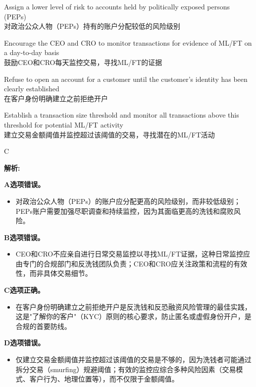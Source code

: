 \documentclass{article}
\newenvironment{explanation}
{\textbf{解析:}\par}
{\par}
\begin{document}
\begin{choices}
    \item Assign a lower level of risk to accounts held by politically exposed persons (PEPs)\\对政治公众人物（PEPs）持有的账户分配较低的风险级别
    \item Encourage the CEO and CRO to monitor transactions for evidence of ML/FT on a day-to-day basis\\鼓励CEO和CRO每天监控交易，寻找ML/FT的证据
    \item Refuse to open an account for a customer until the customer's identity has been clearly established\\在客户身份明确建立之前拒绝开户
    \item Establish a transaction size threshold and monitor all transactions above this threshold for potential ML/FT activity\\建立交易金额阈值并监控超过该阈值的交易，寻找潜在的ML/FT活动
\end{choices}

\begin{correctanswer}
    C
\end{correctanswer}
\begin{explanation}
    \textbf{A选项错误。}
    \begin{itemize}
        \item 对政治公众人物（PEPs）的账户应分配更高的风险级别，而非较低级别；PEPs账户需要加强尽职调查和持续监控，因为其面临更高的洗钱和腐败风险。
    \end{itemize}

    \textbf{B选项错误。}
    \begin{itemize}
        \item CEO和CRO不应亲自进行日常交易监控以寻找ML/FT证据，这种日常监控应由专门的合规部门和反洗钱团队负责；CEO和CRO应关注政策和流程的有效性，而非具体交易细节。
    \end{itemize}

    \textbf{C选项正确。}
    \begin{itemize}
        \item 在客户身份明确建立之前拒绝开户是反洗钱和反恐融资风险管理的最佳实践，这是"了解你的客户"（KYC）原则的核心要求，防止匿名或虚假身份开户，是合规的首要防线。
    \end{itemize}

    \textbf{D选项错误。}
    \begin{itemize}
        \item 仅建立交易金额阈值并监控超过该阈值的交易是不够的，因为洗钱者可能通过拆分交易（smurfing）规避阈值；有效的监控应综合多种风险因素（交易模式、客户行为、地理位置等），而不仅限于金额阈值。
    \end{itemize}
\end{explanation}
\end{document}
